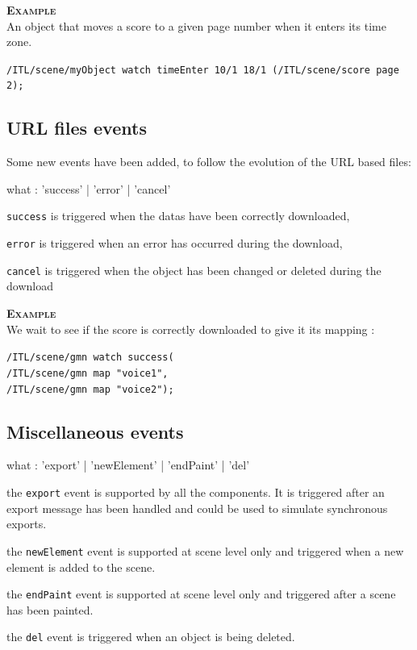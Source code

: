 \documentclass[a4paper,twoside]{report}
\newcommand{\subsublevel}[1]	{\subsection{#1}}
\newcommand{\OSC}[1]		{\texttt{#1}}
\newcommand{\example}		{\textbf{\hspace{-1.5cm}\textbf{\textsc{Example }}}}
\let\olditemize\itemize
\let\oldenditemize\enditemize
\renewenvironment{itemize} 	{\olditemize \setlength{\itemsep}{1mm}}{\oldenditemize}
\newcommand{\sample}	[1]			{\vspace{-2mm}\begin{center}\colorbox{mygrey}{
								\begin{minipage}[t]{0.9\columnwidth} 
								{\small \texttt{#1}}
								\end{minipage}}\end{center}}
\newcommand{\samplev}[1]			{\begin{center}\colorbox{mygrey}{
								\begin{minipage}[t]{\columnwidth} 
								{\small \texttt{#1}}
								\end{minipage}}\end{center}}
\begin{document}
\example \\
An object that moves a score to a given page number when it enters its time zone.
\samplev{/ITL/scene/myObject watch timeEnter 10/1 18/1 (/ITL/scene/score page 2);}

\subsublevel{URL files events}
\label{urlevents}

Some new events have been added, to follow the evolution of the URL based files:

\begin{rail}
what : 	'success'  
		| 'error'
		| 'cancel'
\end{rail}

\begin{itemize}
\item \OSC{success} is triggered when the datas have been correctly downloaded,
\item \OSC{error} is triggered when an error has occurred during the download,
\item \OSC{cancel} is triggered when the object has been changed or deleted during the download
\end{itemize}

\example \\
We wait to see if the score is correctly downloaded to give it its mapping :
\sample{/ITL/scene/gmn watch success(\\
/ITL/scene/gmn map "voice1",\\
/ITL/scene/gmn map "voice2");}


\subsublevel{Miscellaneous events}
\label{miscevents}

\begin{rail}
what : 	  'export'
		| 'newElement'
		| 'endPaint'
		| 'del'
\end{rail}

\begin{itemize}
\item the \OSC{export} event is supported by all the components. It is triggered after an export message has been handled and could be used to simulate synchronous exports.
\item the \OSC{newElement} event is supported at scene level only and triggered when a new element is added to the scene.
\item the \OSC{endPaint} event is supported at scene level only and triggered after a scene has been painted.
\item the \OSC{del} event is triggered when an object is being deleted.
\end{itemize}
\end{document}

